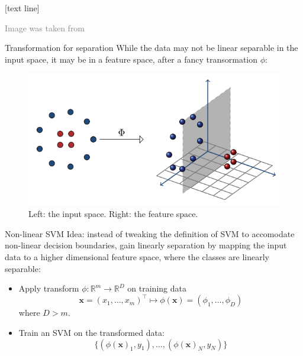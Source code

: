 \documentclass[dvipsnames]{beamer}
\newcommand{\referencefootnote}[1]{\setbeamertemplate{footline}[text line]{%
\parbox{0.9\paperwidth}{\vspace*{-23pt}\tiny{\textcolor{gray}{#1}}\hfill\scriptsize\insertframenumber}}}
\begin{document}
			{ \referencefootnote{Image was taken from \cite{mohri_fom}}
			\begin{frame}{Transformation for separation}
				While the data may not be linear separable in the input space, it may be in a feature space, after a fancy transormation $\phi$:
				\begin{figure}
					\center
					\includegraphics[scale=.5]{figures/nonlinear5.png}
					\caption{Left: the input space. Right: the feature space.}
        \end{figure}
			\end{frame}
			}
				
			\begin{frame}{Non-linear SVM}
				Idea: instead of tweaking the definition of SVM to accomodate non-linear decision boundaries, gain linearly separation by mapping the input data to a higher dimensional feature space, where the classes are linearly separable: \pause
				\begin{itemize}
					\item Apply transform $\phi:\mathbb{R}^m\rightarrow \mathbb{R}^{D}$ on training data
					\[
					\mathbf{x} = (x_1,\dots,x_m)^{\top} \mapsto \phi(\mathbf{x}) = (\phi_1,\dots,\phi_{D})
					\]
					where $D > m$. \pause
					\item Train an SVM on the transformed data:
					\[
						\{(\phi(\textbf{x})_1,y_1), \dots, (\phi(\textbf{x})_N,y_N)\}
					\]					
				\end{itemize}
			\end{frame}
			
\end{document}
